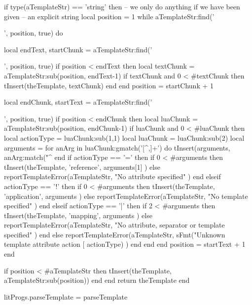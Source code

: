   if type(aTemplateStr) == 'string' then
    -- we only do anything if we have been given
    -- an explicit string
    local position = 1
    while aTemplateStr:find('{{', position, true) do

      local endText, startChunk = aTemplateStr:find('{{', position, true)
      if position < endText then
        local textChunk = aTemplateStr:sub(position, endText-1)
        if textChunk and 0 < #textChunk then
          tInsert(theTemplate, textChunk)
        end
      end
      position = startChunk + 1

      local endChunk, startText = aTemplateStr:find('}}', position, true)
      if position < endChunk then
        local luaChunk = aTemplateStr:sub(position, endChunk-1)
        if luaChunk and 0 < #luaChunk then
          local actionType = luaChunk:sub(1,1)
          local luaChunk = luaChunk:sub(2)
          local arguments = { }
          for anArg in luaChunk:gmatch('[^,]+') do
            tInsert(arguments, anArg:match("^%
          end
          if actionType == '=' then
            if 0 < #arguments then
              tInsert(theTemplate, { 'reference', arguments[1] })
            else
              reportTemplateError(aTemplateStr,
                "No attribute specified"
              )
            end
          elseif actionType == '!' then
            if 0 < #arguments then
              tInsert(theTemplate, { 'application', arguments })
            else
              reportTemplateError(aTemplateStr,
                "No template specified"
              )
            end
          elseif actionType == '|' then
            if 2 < #arguments then
              tInsert(theTemplate, { 'mapping', arguments })
            else
              reportTemplateError(aTemplateStr,
                "No attribute, separator or template specified"
              )
            end
          else
            reportTemplateError(aTemplateStr,
              sFmt("Unknown template attribute action [%
                actionType)
            )
          end
        end
      end
      position = startText + 1
    end

    if position < #aTemplateStr then
      tInsert(theTemplate, aTemplateStr:sub(position))
    end
  end
  return theTemplate
end

litProgs.parseTemplate = parseTemplate
\stopLuaCode


}}
